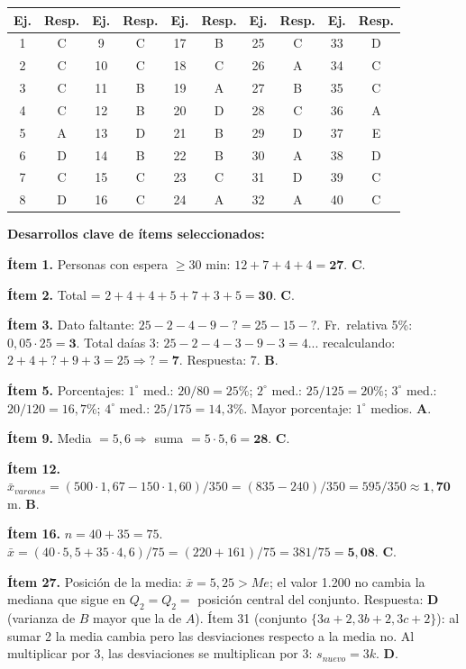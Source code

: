 \documentclass[11pt, letterpaper]{article}
\begin{document}
\begin{center}
\renewcommand{\arraystretch}{1.3}
\begin{tabular}{c|c||c|c||c|c||c|c||c|c}
\toprule
\textbf{Ej.} & \textbf{Resp.} & \textbf{Ej.} & \textbf{Resp.} & \textbf{Ej.} & \textbf{Resp.} & \textbf{Ej.} & \textbf{Resp.} & \textbf{Ej.} & \textbf{Resp.}\\
\midrule
1  & C & 9  & C & 17 & B & 25 & C & 33 & D\\
2  & C & 10 & C & 18 & C & 26 & A & 34 & C\\
3  & C & 11 & B & 19 & A & 27 & B & 35 & C\\
4  & C & 12 & B & 20 & D & 28 & C & 36 & A\\
5  & A & 13 & D & 21 & B & 29 & D & 37 & E\\
6  & D & 14 & B & 22 & B & 30 & A & 38 & D\\
7  & C & 15 & C & 23 & C & 31 & D & 39 & C\\
8  & D & 16 & C & 24 & A & 32 & A & 40 & C\\
\bottomrule
\end{tabular}
\end{center}

\medskip
\textbf{Desarrollos clave de \'items seleccionados:}

\medskip
\textbf{\'Item 1.} Personas con espera $\geq 30$ min: $12+7+4+4=\mathbf{27}$. \textbf{C}.

\textbf{\'Item 2.} Total = $2+4+4+5+7+3+5=\mathbf{30}$. \textbf{C}.

\textbf{\'Item 3.} Dato faltante: $25-2-4-9-? = 25-15-?$. Fr.\ relativa 5\%: $0{,}05\cdot25=\mathbf{3}$. Total da\'ias 3: $25-2-4-3-9-3=4$... recalculando: $2+4+?+9+3=25\Rightarrow ?=\mathbf{7}$. Respuesta: 7. \textbf{B}.

\textbf{\'Item 5.} Porcentajes: $1^\circ$ med.: $20/80=25\%$; $2^\circ$ med.: $25/125=20\%$; $3^\circ$ med.: $20/120=16{,}7\%$; $4^\circ$ med.: $25/175=14{,}3\%$. Mayor porcentaje: $1^\circ$ medios. \textbf{A}.

\textbf{\'Item 9.} Media $= 5{,}6 \Rightarrow$ suma $= 5\cdot5{,}6=\mathbf{28}$. \textbf{C}.

\textbf{\'Item 12.} $\bar{x}_{varones} = (500\cdot1{,}67-150\cdot1{,}60)/350 = (835-240)/350 = 595/350\approx\mathbf{1{,}70}$ m. \textbf{B}.

\textbf{\'Item 16.} $n=40+35=75$. $\bar{x}=(40\cdot5{,}5+35\cdot4{,}6)/75=(220+161)/75=381/75=\mathbf{5{,}08}$. \textbf{C}.

\textbf{\'Item 27.} Posici\'on de la media: $\bar{x}=5{,}25>Me$; el valor 1.200 no cambia la mediana que sigue en $Q_2=Q_2=$ posici\'on central del conjunto. Respuesta: \textbf{D} (varianza de $B$ mayor que la de $A$). \'Item 31 (conjunto $\{3a+2,3b+2,3c+2\}$): al sumar 2 la media cambia pero las desviaciones respecto a la media no. Al multiplicar por 3, las desviaciones se multiplican por 3: $s_{nuevo}=3k$. \textbf{D}.
\end{document}
